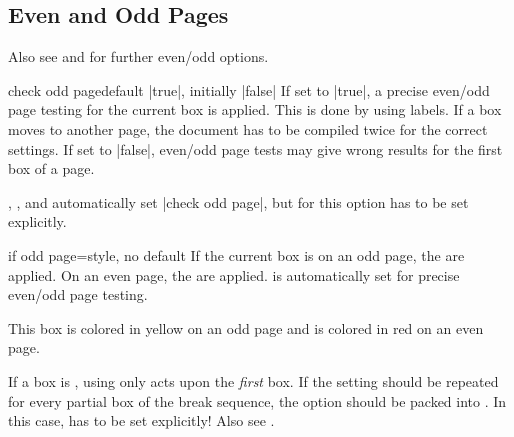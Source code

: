 \clearpage
\subsection{Even and Odd Pages}

\begin{marker}
Also see
 and
for further even/odd options.
\end{marker}

\begin{docTcbKey}[][doc updated=2015-11-13]{check odd page}{}{default |true|, initially |false|}
If set to |true|, a precise even/odd page testing for the current box
is applied. This is done by using labels. If a box moves to another page,
the document has to be compiled twice for the correct settings.
If set to |false|, even/odd page tests may give wrong results for the first box
of a page.

,
, and
automatically set |check odd page|, but for
 this option has to be set explicitly.
\end{docTcbKey}

\enlargethispage*{1cm}
\begin{docTcbKey}[][doc new=2015-11-13]{if odd page}{=}{style, no default}
If the current box is on an odd page, the  are applied.
On an even page, the  are applied.
 is automatically set for precise even/odd page testing.

\begin{dispExample}
\begin{tcolorbox}[if odd page={colback=yellow!50}{colback=red!50}]
  This box is colored in yellow on an odd page
  and is colored in red on an even page.
\end{tcolorbox}
\end{dispExample}

\begin{marker}
If a box is , using 
only acts upon the \emph{first} box. If the setting should be
repeated for every partial box of the break sequence, the option should be
packed into . In this case, 
has to be set explicitly! Also see .
\end{marker}
\end{docTcbKey}


